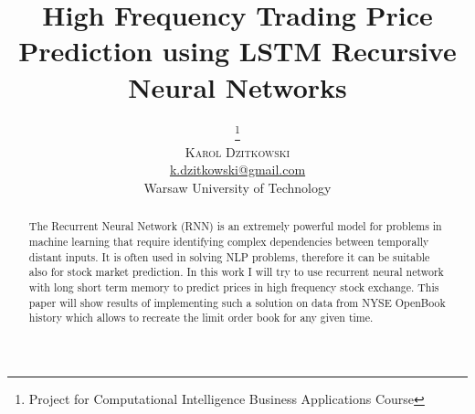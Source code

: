 \documentclass[twoside]{article}
\title{\vspace{-15mm}\fontsize{24pt}{10pt}\selectfont\textbf{High Frequency Trading Price Prediction using LSTM Recursive Neural Networks}} %
\author{
\large
\thanks{Project for Computational Intelligence Business Applications Course}\\[2mm] %
\textsc{Karol Dzitkowski}\\
\normalsize \href{mailto:k.dzitkowski@gmail.com}{k.dzitkowski@gmail.com} \\
\normalsize Warsaw University of Technology\\
\vspace{-5mm}
}
\date{}
\begin{document}
\maketitle %

\thispagestyle{fancy} %


\begin{abstract}

The Recurrent Neural Network (RNN) is an extremely powerful model for problems in machine learning that require identifying complex dependencies between temporally distant inputs. It is often used in solving NLP problems, therefore it can be suitable also for stock market prediction. 
In this work I will try to use recurrent neural network with long short term memory to predict prices in high frequency stock exchange. This paper will show results of implementing such a solution on data from NYSE OpenBook history which allows to recreate the limit order book for any given time.

\end{abstract}

\end{document}

